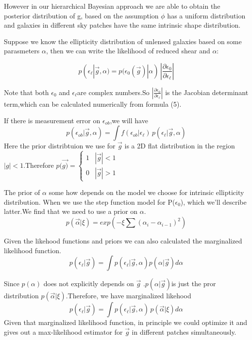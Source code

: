 \documentclass[useAMS,usenatbib]{mn2e}
\begin{document}
However in our hierarchical Bayesian approach we are able to obtain
the posterior distribution of g, based on the assumption $\phi$ has
a uniform distribution and galaxies in different sky patches have
the same intrinsic shape distribution.

Suppose we know the ellipticity distribution of unlensed galaxies
based on some parasmeters $\alpha$, then we can write the likelihood
of reduced shear and $\alpha$:

\begin{equation}
p(\epsilon_{\ell}|\vec{g},\alpha)=p(\epsilon_{0}(\vec{g})|\alpha)\,|\frac{\partial\epsilon_{0}}{\partial\epsilon_{\ell}}|
\end{equation}



Note that both $\epsilon_{0}$ and $\epsilon_{\ell}$are complex numbers.So
$|\frac{\partial\epsilon_{0}}{\partial\epsilon_{\ell}}|$ is the Jacobian
determinant term,which can be calculated numerically from formula
(5).

If there is measurement error on $\epsilon_{ob}$,we will have 
\begin{equation}
p(\epsilon_{ob}|\vec{g},\alpha)=\int f(\epsilon_{ob}|\epsilon_{\ell})\, p(\epsilon_{\ell}|\vec{g},\alpha)
\end{equation}
Here the prior distribtuion we use for $\vec{g}$ is a 2D flat distribution
in the region $|g|<1$.Therefore $p(\vec{g)}=\begin{cases}
1 & |\vec{g}|<1\\
0 & |\vec{g}|>1
\end{cases}$

The prior of $\alpha$ some how depends on the model we choose for
intrinsic ellipticity distribution. When we use the step function
model for P($\epsilon_{0}$), which we'll describe latter.We find that
we need to use a prior on $\alpha$. 
\begin{equation}
p(\vec{\alpha}|\xi)=exp(-\xi\sum(\alpha_{i}-\alpha_{i-1})^{2})
\end{equation}


Given the likehood functions and priors we can also calculated the
marginalized likelihood function. 
\begin{equation}
p(\epsilon_{\ell}|\vec{g})=\int p(\epsilon_{\ell}|\vec{g},\alpha)p(\alpha|\vec{g})d\alpha
\end{equation}


Since $p(\alpha)$ does not explicitly depends on $\vec{g}$ .$p(\alpha|\vec{g})$is
just the pror distribution $p(\vec{\alpha}|\xi)$.Therefore, we have
marginalized likehood 
\begin{equation}
p(\epsilon_{\ell}|\vec{g})=\int p(\epsilon_{\ell}|\vec{g},\alpha)\, p(\vec{\alpha}|\xi)d\alpha
\end{equation}
Given that marginalized likelihood function, in principle we could
optimize it and gives out a max-likelihood estimator for $\vec{g}$
in different patches simultaneously.
\end{document}
